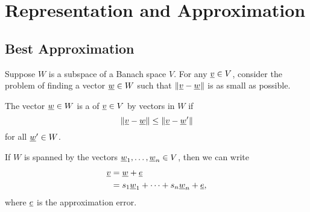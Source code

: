 \chapter{Representation and Approximation}

\section{Best Approximation}
Suppose $W$ is a subspace of a Banach space $V$.
For any $\underline{v} \in V$, consider the problem of finding a vector $\underline{w} \in W$ such that $\left\| \underline{v} - \underline{w} \right\|$ is as small as possible.
\begin{definition}
The vector $\underline{w} \in W$ is a  of $\underline{v} \in V$ by vectors in $W$ if
\begin{equation*}
\left\| \underline{v} - \underline{w} \right\| \leq \left\| \underline{v} - \underline{w}' \right\|
\end{equation*}
for all $\underline{w}' \in W$.
\end{definition}
\noindent If $W$ is spanned by the vectors $\underline{w}_1, \ldots, \underline{w}_n \in V$, then we can write
\begin{equation*}
\begin{split}
\underline{v} &= \underline{w} + \underline{e} \\
&= s_1 \underline{w}_1 + \cdots + s_n \underline{w}_n + \underline{e},
\end{split}
\end{equation*}
where $\underline{e}$ is the approximation error.

